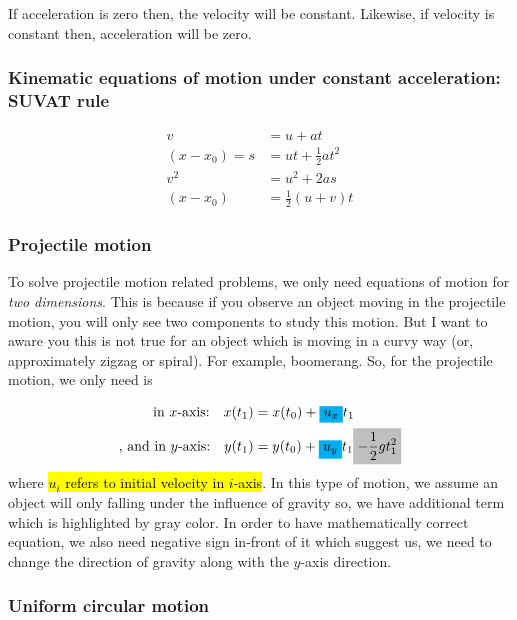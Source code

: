 \documentclass[12pt,a4paper]{article}
\newcommand{\mathcolorbox}[2]{\colorbox{#1}{$\displaystyle #2$}}
\DeclareRobustCommand{\hlcyan}[1]{{\sethlcolor{cyan}\hl{#1}}}
\begin{document}
If acceleration is zero then, the velocity will be constant. Likewise, if velocity is constant then, acceleration will be zero.

\subsubsection*{Kinematic equations of motion under constant acceleration: SUVAT rule}
\begin{align}
v &= u + at\\
(x - x_{0}) = s &= ut + \frac{1}{2}at^{2} \\
v^{2} &= u^{2} + 2as \\
(x - x_{0}) &= \frac{1}{2}(u + v)t 
\end{align}

\subsubsection{Projectile motion}

To solve projectile motion related problems, we only need equations of motion for \emph{two dimensions}. This is because if you observe an object moving in the projectile motion, you will only see two components to study this motion. But I want to aware you this is not true for an object which is moving in a curvy way (or, approximately zigzag or spiral). For example, boomerang. So, for the projectile motion, we only need is

\begin{align*}
\text{in $x$-axis:\quad} x(t_{1}) &= x(t_{0}) + \mathcolorbox{cyan}{u_{x}}t_{1} \\
\text{, and in $y$-axis:\quad} y(t_{1}) &= y(t_{0}) + \mathcolorbox{cyan}{u_{y}}t_{1} \mathcolorbox{lightgray}{ - \frac{1}{2}g t^{2}_{1}}
\end{align*}
where \hlcyan{$u_{i}$ refers to initial velocity in $i$-axis}. In this type of motion, we assume an object will only falling under the influence of gravity so, we have additional term which is highlighted by gray color. In order to have mathematically correct equation, we also need negative sign in-front of it which suggest us, we need to change the direction of gravity along with the $y$-axis direction. 

\subsubsection{Uniform circular motion}
\end{document}
